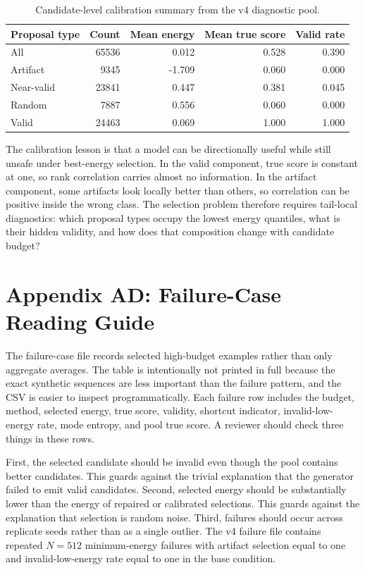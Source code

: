 \documentclass{article}
\begin{document}
\begin{table}[t]
\centering
\small
\begin{tabular}{lrrrr}
\toprule
Proposal type & Count & Mean energy & Mean true score & Valid rate \\
\midrule
All & 65536 & 0.012 & 0.528 & 0.390 \\
Artifact & 9345 & -1.709 & 0.060 & 0.000 \\
Near-valid & 23841 & 0.447 & 0.381 & 0.045 \\
Random & 7887 & 0.556 & 0.060 & 0.000 \\
Valid & 24463 & 0.069 & 1.000 & 1.000 \\
\bottomrule
\end{tabular}
\caption{Candidate-level calibration summary from the v4 diagnostic pool.}
\label{tab:candidate-calibration}
\end{table}

The calibration lesson is that a model can be directionally useful while still
unsafe under best-energy selection. In the valid component, true score is
constant at one, so rank correlation carries almost no information. In the
artifact component, some artifacts look locally better than others, so
correlation can be positive inside the wrong class. The selection problem
therefore requires tail-local diagnostics: which proposal types occupy the
lowest energy quantiles, what is their hidden validity, and how does that
composition change with candidate budget?

\section*{Appendix AD: Failure-Case Reading Guide}

The failure-case file records selected high-budget examples rather than only
aggregate averages. The table is intentionally not printed in full because the
exact synthetic sequences are less important than the failure pattern, and the
CSV is easier to inspect programmatically. Each failure row includes the
budget, method, selected energy, true score, validity, shortcut indicator,
invalid-low-energy rate, mode entropy, and pool true score. A reviewer should
check three things in these rows.

First, the selected candidate should be invalid even though the pool contains
better candidates. This guards against the trivial explanation that the
generator failed to emit valid candidates. Second, selected energy should be
substantially lower than the energy of repaired or calibrated selections. This
guards against the explanation that selection is random noise. Third, failures
should occur across replicate seeds rather than as a single outlier. The v4
failure file contains repeated $N=512$ minimum-energy failures with artifact
selection equal to one and invalid-low-energy rate equal to one in the base
condition.
\end{document}
